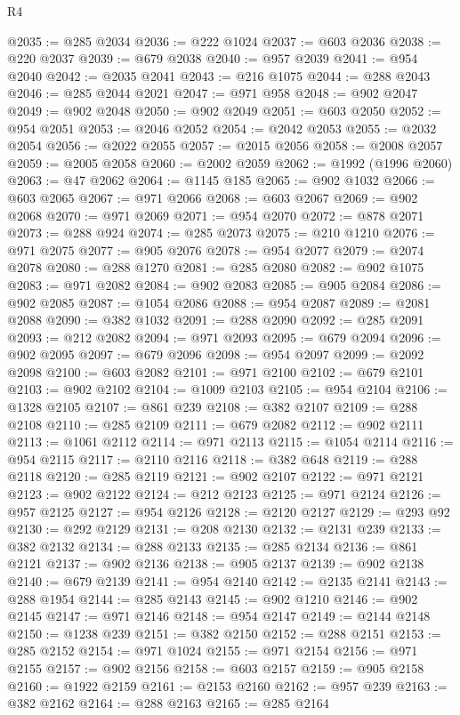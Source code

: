 \begin{lexlean}{R4}
\begin{coremodule}
@2035 := @285 @2034
@2036 := @222 @1024
@2037 := @603 @2036
@2038 := @220 @2037
@2039 := @679 @2038
@2040 := @957 @2039
@2041 := @954 @2040
@2042 := @2035 @2041
@2043 := @216 @1075
@2044 := @288 @2043
@2046 := @285 @2044 @2021
@2047 := @971 @958
@2048 := @902 @2047
@2049 := @902 @2048
@2050 := @902 @2049
@2051 := @603 @2050
@2052 := @954 @2051
@2053 := @2046 @2052
@2054 := @2042 @2053
@2055 := @2032 @2054
@2056 := @2022 @2055
@2057 := @2015 @2056
@2058 := @2008 @2057
@2059 := @2005 @2058
@2060 := @2002 @2059
@2062 := @1992 (@1996 @2060)
@2063 := @47 @2062
@2064 := @1145 @185
@2065 := @902 @1032
@2066 := @603 @2065
@2067 := @971 @2066
@2068 := @603 @2067
@2069 := @902 @2068
@2070 := @971 @2069
@2071 := @954 @2070
@2072 := @878 @2071
@2073 := @288 @924
@2074 := @285 @2073
@2075 := @210 @1210
@2076 := @971 @2075
@2077 := @905 @2076
@2078 := @954 @2077
@2079 := @2074 @2078
@2080 := @288 @1270
@2081 := @285 @2080
@2082 := @902 @1075
@2083 := @971 @2082
@2084 := @902 @2083
@2085 := @905 @2084
@2086 := @902 @2085
@2087 := @1054 @2086
@2088 := @954 @2087
@2089 := @2081 @2088
@2090 := @382 @1032
@2091 := @288 @2090
@2092 := @285 @2091
@2093 := @212 @2082
@2094 := @971 @2093
@2095 := @679 @2094
@2096 := @902 @2095
@2097 := @679 @2096
@2098 := @954 @2097
@2099 := @2092 @2098
@2100 := @603 @2082
@2101 := @971 @2100
@2102 := @679 @2101
@2103 := @902 @2102
@2104 := @1009 @2103
@2105 := @954 @2104
@2106 := @1328 @2105
@2107 := @861 @239
@2108 := @382 @2107
@2109 := @288 @2108
@2110 := @285 @2109
@2111 := @679 @2082
@2112 := @902 @2111
@2113 := @1061 @2112
@2114 := @971 @2113
@2115 := @1054 @2114
@2116 := @954 @2115
@2117 := @2110 @2116
@2118 := @382 @648
@2119 := @288 @2118
@2120 := @285 @2119
@2121 := @902 @2107
@2122 := @971 @2121
@2123 := @902 @2122
@2124 := @212 @2123
@2125 := @971 @2124
@2126 := @957 @2125
@2127 := @954 @2126
@2128 := @2120 @2127
@2129 := @293 @92
@2130 := @292 @2129
@2131 := @208 @2130
@2132 := @2131 @239
@2133 := @382 @2132
@2134 := @288 @2133
@2135 := @285 @2134
@2136 := @861 @2121
@2137 := @902 @2136
@2138 := @905 @2137
@2139 := @902 @2138
@2140 := @679 @2139
@2141 := @954 @2140
@2142 := @2135 @2141
@2143 := @288 @1954
@2144 := @285 @2143
@2145 := @902 @1210
@2146 := @902 @2145
@2147 := @971 @2146
@2148 := @954 @2147
@2149 := @2144 @2148
@2150 := @1238 @239
@2151 := @382 @2150
@2152 := @288 @2151
@2153 := @285 @2152
@2154 := @971 @1024
@2155 := @971 @2154
@2156 := @971 @2155
@2157 := @902 @2156
@2158 := @603 @2157
@2159 := @905 @2158
@2160 := @1922 @2159
@2161 := @2153 @2160
@2162 := @957 @239
@2163 := @382 @2162
@2164 := @288 @2163
@2165 := @285 @2164

\end{coremodule}
\end{lexlean}
